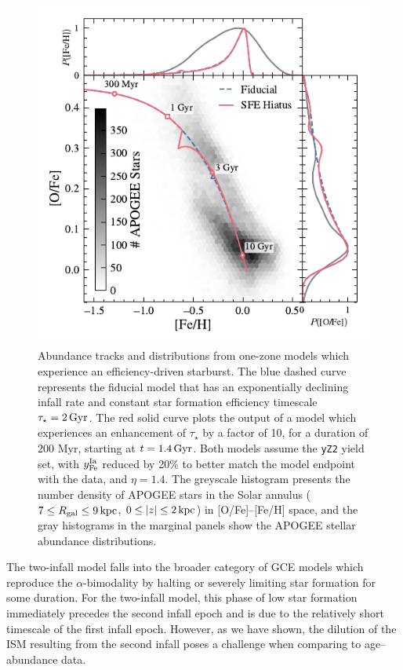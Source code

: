 \documentclass[twocolumn,twocolappendix,linenumbers]{aastex631}
\begin{document}
\begin{figure}
    \centering
    \includegraphics{figures/onezone_sfe_hiatus.pdf}
    \caption{Abundance tracks and distributions from one-zone models which experience an efficiency-driven starburst. The blue dashed curve represents the fiducial model that has an exponentially declining infall rate and constant star formation efficiency timescale $\tau_\star=2\,{\rm Gyr}$. The red solid curve plots the output of a model which experiences an enhancement of $\tau_\star$ by a factor of 10, for a duration of 200 Myr, starting at $t=1.4\,{\rm Gyr}$. Both models assume the {\tt yZ2} yield set, with $y_{\rm Fe}^{\rm Ia}$ reduced by 20\% to better match the model endpoint with the data, and $\eta=1.4$. The greyscale histogram presents the number density of APOGEE stars in the Solar annulus ($7\leq R_{\rm gal}\leq 9\,{\rm kpc}$, $0\leq|z|\leq2\,{\rm kpc}$) in [O/Fe]--[Fe/H] space, and the gray histograms in the marginal panels show the APOGEE stellar abundance distributions.}
    \label{fig:onezone-sfe-hiatus}
\end{figure}

The two-infall model falls into the broader category of GCE models which reproduce the $\alpha$-bimodality by halting or severely limiting star formation for some duration. For the two-infall model, this phase of low star formation immediately precedes the second infall epoch and is due to the relatively short timescale of the first infall epoch. However, as we have shown, the dilution of the ISM resulting from the second infall poses a challenge when comparing to age--abundance data.
\end{document}
